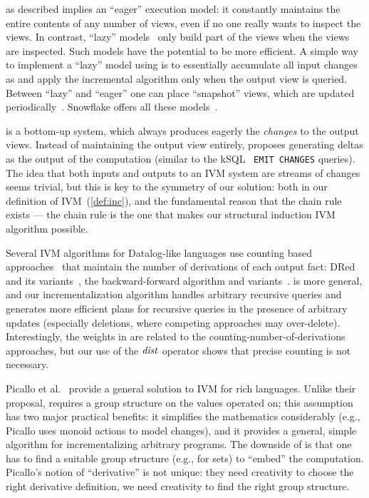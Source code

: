 \dbsp as described implies an ``eager'' execution model: it constantly
maintains the entire contents of any number of views, even if no one
really wants to inspect the views.  In contrast, ``lazy''
models~\cite{hanson-sigmod87} only build part of the views when the
views are inspected.  Such models have the potential to be more
efficient.  A simple way to implement a ``lazy'' model using \dbsp is
to essentially accumulate all input changes as \zrs and apply the
incremental algorithm only when the output view is queried.  Between
``lazy'' and ``eager'' one can place ``snapshot'' views, which are
updated periodically~\cite{colby-sigmod97}.  Snowflake offers all
these models~\cite{akidau-amd23}.

\dbsp is a bottom-up system, which always produces eagerly the
\emph{changes} to the output views.  Instead of maintaining the output
view entirely, \dbsp proposes generating deltas as the output of the
computation (similar to the kSQL~\cite{jafarpour-edbt19} \texttt{EMIT
  CHANGES} queries).  The idea that both inputs and outputs to an IVM
system are streams of changes seems trivial, but this is key to the
symmetry of our solution: both in our definition of
IVM~(\ref{def:inc}), and the fundamental reason that the chain rule
exists --- the chain rule is the one that makes our structural
induction IVM algorithm possible.

Several IVM algorithms for Datalog-like languages use counting based
approaches~\cite{Dewan-iis92,motik-aaai15} that maintain the number of
derivations of each output fact: DRed~\cite{gupta-sigmod93} and its
variants~\cite{Ceri-VLDB91,Wolfson-sigmod91,Staudt-vldb96,Kotowski-rr11,Lu-sigmod95,Apt-sigmod87},
the backward-for\-ward algorithm and
variants~\cite{motik-aaai15,Harrison-wdd92,motik-ai19}.  \dbsp is more
general, and our incrementalization algorithm handles arbitrary
recursive queries and generates more efficient plans for recursive
queries in the presence of arbitrary updates (especially deletions,
where competing ap\-proach\-es may over-delete).  Interestingly, the \zrs
weights in \dbsp are related to the counting-number-of-derivations
approaches, but our use of the $\mathit{dist}$ operator shows that precise
counting is not necessary.

Picallo et al.~\cite{picallo-scop19} provide a general solution to IVM
for rich languages.  Unlike their proposal, \dbsp requires a group
structure on the values operated on; this assumption has two major
practical benefits: it simplifies the mathematics considerably (e.g.,
Picallo uses monoid actions to model changes), and it provides a
general, simple algorithm for incrementalizing arbitrary programs.
The downside of \dbsp is that one has to find a suitable group
structure (e.g., \zrs for sets) to ``embed'' the computation.
Picallo's notion of ``derivative'' is not unique: they need creativity
to choose the right derivative definition, we need creativity to find
the right group structure.


